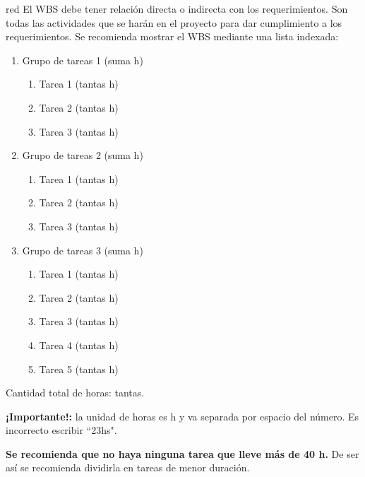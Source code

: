 \documentclass[
    11pt, %
]{charter}
\begin{document}
    \begin{consigna}{red}
        El WBS debe tener relación directa o indirecta con los requerimientos. Son todas las actividades que se harán en el proyecto para dar cumplimiento a los requerimientos. Se recomienda mostrar el WBS mediante una lista indexada:

        \begin{enumerate}
            \item Grupo de tareas 1 (suma h)
            \begin{enumerate}
                \item Tarea 1 (tantas h)
                \item Tarea 2 (tantas h)
                \item Tarea 3 (tantas h)
            \end{enumerate}
            \item Grupo de tareas 2 (suma h)
            \begin{enumerate}
                \item Tarea 1 (tantas h)
                \item Tarea 2 (tantas h)
                \item Tarea 3 (tantas h)
            \end{enumerate}
            \item Grupo de tareas 3 (suma h)
            \begin{enumerate}
                \item Tarea 1 (tantas h)
                \item Tarea 2 (tantas h)
                \item Tarea 3 (tantas h)
                \item Tarea 4 (tantas h)
                \item Tarea 5 (tantas h)
            \end{enumerate}
        \end{enumerate}

        Cantidad total de horas: tantas.

        \textbf{¡Importante!:} la unidad de horas es h y va separada por espacio del número. Es incorrecto escribir ``23hs".

        \textbf{Se recomienda que no haya ninguna tarea que lleve más de 40 h.} De ser así se recomienda dividirla en tareas de menor duración.

    \end{consigna}
\end{document}
